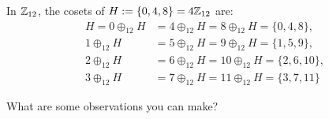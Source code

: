 \documentclass[../algebraNotesMSRI-UP2016.tex]{subfiles}
\begin{document}
\begin{comment}
\begin{frame}
\begin{dfn}\label{dfn:normal}
A subgroup $H<G$ is \vocab{normal} in $G$ means $gH=Hg$ for all $g\in G$.  We write $H\norml G$.
\end{dfn}

\smallGap 
We may also say a subgroup $H<G$ is normal if and only if $H$ is closed under \vocab{conjugacy}, meaning, $g\1Hg=H$ for all $g\in G$.  Evidently this is equivalent to Definition \ref{dfn:normal}.  The operation 
\begin{align*}
g:\{\text{subgroups in $G$}\} &\to \{\text{subgroups in $G$}\} \\
 H &\mapsto g\1Hg
\end{align*} 
for fixed $g\in G$ is called \vocab{conjugation}.  We can also conjugate individual elements $h\in G$, i.e., $g\1hg$.  %
\end{frame}

\begin{frame}
\begin{ex}\label{ex:trivialNormal}
For any group $G$, the two \vocab{trivial} subgroups, $\langle 1_G\rangle<G$ and $G<G$, are normal.
\end{ex}

\smallGap
\begin{exe}\label{exe:normalKernel}
Prove the kernel of a group homormorphism is always normal in its source.
\end{exe}

\smallGap
\begin{exe}\label{exe:normalSubgroups}
Prove all subgroups of an abelian group are normal.
\end{exe}

\smallGap
Nearly all the groups we consider are abelian.  By default we shall work with left cosets, keeping in mind all statements we make have right coset analogues.  
\end{frame}

\end{comment}

\begin{frame}
\begin{ex}
In $\mathbb Z_{12}$, the cosets of $H:=\{0,4,8\}=4\mathbb Z_{12}$ are:
\begin{align*}
H = 0\oplus_{12}H &= 4\oplus_{12}H = 8\oplus_{12}H = \{0,4,8\}, \\
	 1\oplus_{12}H &= 5\oplus_{12}H = 9\oplus_{12}H = \{1,5,9\},	\\
	 2\oplus_{12}H &= 6\oplus_{12}H = 10\oplus_{12}H = \{2,6,10\}, \\
	 3\oplus_{12}H &= 7\oplus_{12}H = 11\oplus_{12}H = \{3,7,11\} 
\end{align*}
\end{ex}

\smallGap
\begin{que}
What are some observations you can make?
\end{que}
\end{frame}
\end{document}
